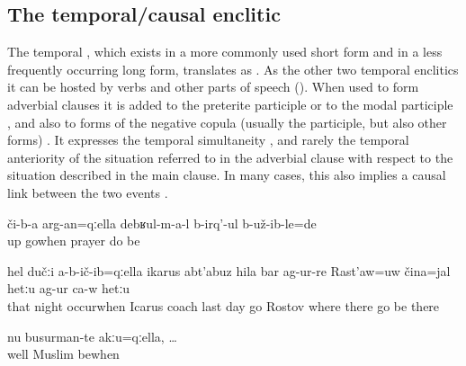 
\subsection{The temporal/causal enclitic  }
\label{sec:enclitic =qella}

The temporal , which exists in a more commonly used short form and in a less frequently occurring long form, translates as . As the other two temporal enclitics it can be hosted by verbs and other parts of speech (). When used to form adverbial clauses it is added to the preterite participle  or to the modal participle , and also to forms of the negative copula (usually the participle, but also other forms) . It expresses the temporal simultaneity , and rarely the temporal anteriority  of the situation referred to in the adverbial clause with respect to the situation described in the main clause. In many cases, this also implies a causal link between the two events .
%

\begin{exe}
	\ex	\label{ex:‎When they went up there they were praying}
	\gll	či-b-a	arg-an=qːella		debʁul-m-a-l	b-irq'-ul	b-už-ib-le=de\\
		up	gowhen	prayer	do	be\\
	\glt	{}

	\ex	\label{ex:‎When / after / because at that night}
	\gll	hel	dučːi	a-b-ič-ib=qːella	ikarus	abt'abuz	hila	bar	ag-ur-re	Rast'aw=uw	čina=jal	hetːu	ag-ur	ca-w	hetːu\\
		that	night	occurwhen	Icarus	coach	last	day	go	Rostov	where	there	go	be	there\\
	\glt	{}

	\ex	\label{ex:Well because (they) were not Muslims}
	\gll	nu	busurman-te	akːu=qːella,	\ldots\\
		well	Muslim 	bewhen\\
	\glt	{}
\end{exe}


